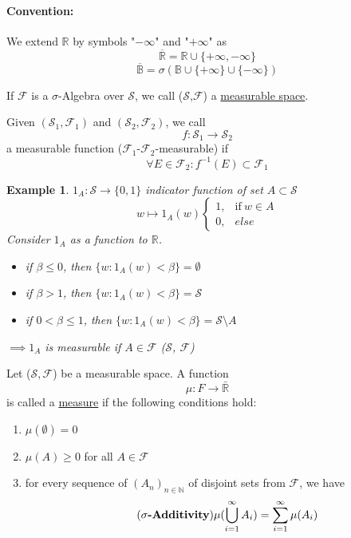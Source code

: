 \documentclass[10pt,a4paper]{article}
\theoremstyle{definition}
\theoremstyle{plain}
\newtheorem{example}{Example}[definition]
\begin{document}
\paragraph{Convention:} We extend $\mathbb{R}$ by symbols "$-\infty$" and "$+\infty$" as\\
	$$ \overline{\mathbb{R}} = \mathbb{R} \cup \{+\infty, -\infty\} $$
	$$ \overline{\mathbb{B}} = \sigma(\mathbb{B} \cup \{+\infty\} \cup \{-\infty\} )$$

\begin{boxeddef}
	\label{Measurable_Space}
	If $\mathcal{F}$ is a $\sigma$-Algebra over $\mathcal{S}$, we call ($\mathcal{S}$,$\mathcal{F}$) a \underline{measurable space}. 
\end{boxeddef}

\begin{boxedsubdef}
	Given $(\mathcal{S}_1, \mathcal{F}_1)$ and $(\mathcal{S}_2, \mathcal{F}_2)$, we call
	$$f: \mathcal{S}_1 \rightarrow \mathcal{S}_2$$
	a measurable function ($\mathcal{F}_1$-$\mathcal{F}_2$-measurable) if
	 $$\forall E \in \mathcal{F}_2: f^{-1}(E) \subset \mathcal{F}_1$$
\end{boxedsubdef}

\begin{example}
$1_A : \mathcal{S} \rightarrow \{0, 1\}$ indicator function of set $A \subset \mathcal{S}$
$$w \mapsto 1_A(w) \begin{cases}
	1, & \text{if}\ w \in A \\
	0, & else
\end{cases}$$
Consider $1_A$ as a function to $\mathbb{R}$.
\begin{itemize}
	\item if $\beta \leq 0$, then $\{w: 1_A(w)<\beta\} = \emptyset$
	\item if $\beta > 1$, then $\{w: 1_A(w)<\beta\} = \mathcal{S}$
	\item if $0 < \beta \leq 1$, then $\{w: 1_A(w)<\beta\} = \mathcal{S} \setminus A$
\end{itemize}
$\implies 1_A$ is measurable if $A \in \mathcal{F}$ ($\mathcal{S}$, $\mathcal{F}$)
\end{example}

\begin{boxeddef}[Measure]
	\label{measure}
	Let ($\mathcal{S,F}$) be a measurable space. A function
	$$\mu: F \rightarrow \bar{\mathbb{R}}$$
	is called a \underline{measure} if the following conditions hold:
	\begin{enumerate}
		\item $\mu(\emptyset) = 0$
		\item $\mu(A) \geq 0$ for all $A \in \mathcal{F}$
		\item  for every sequence of $(A_n)_{n \in \mathbb{N}}$ of disjoint sets from $\mathcal{F}$, we have 
			\begin{equation}
				\tag{\textbf{$\sigma\text{-Additivity}$}}
				\mu (\bigcup_{i = 1}^{\infty} A_i) = \sum_{i = 1}^{\infty} \mu(A_i)
			\end{equation} 
	\end{enumerate}
\end{boxeddef}
\end{document}
